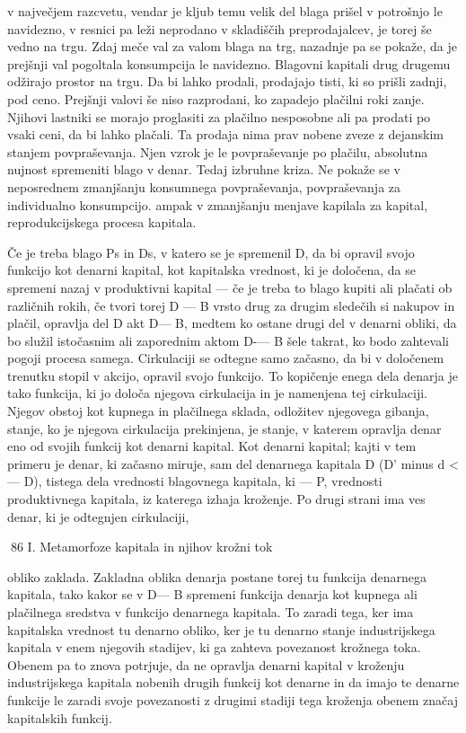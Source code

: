 \documentclass[kapital_02.tex]{subfiles}
\begin{document}
 v največjem razcvetu, vendar je kljub temu velik del blaga prišel v potrošnjo le navidezno, v resnici pa leži neprodano v skladiščih preprodajalcev, je torej še vedno na trgu. Zdaj meče val za valom blaga na trg, nazadnje pa se pokaže, da je prejšnji val pogoltala konsumpcija le navidezno. Blagovni kapitali drug drugemu odžirajo prostor na trgu. Da bi lahko prodali, prodajajo tisti, ki so prišli zadnji, pod ceno. Prejšnji valovi še niso razprodani, ko zapadejo plačilni roki zanje. Njihovi lastniki se morajo proglasiti za plačilno nesposobne ali pa prodati po vsaki ceni, da bi lahko plačali. Ta prodaja nima prav nobene zveze z dejanskim stanjem povpraševanja. Njen vzrok je le povpraševanje po plačilu, absolutna nujnost spremeniti blago v denar. Tedaj izbruhne kriza. Ne pokaže se v neposrednem zmanjšanju konsumnega povpraševanja, povpraševanja za individualno konsumpcijo. ampak v zmanjšanju menjave kapilala za kapital, reprodukcijskega procesa kapitala.

Če je treba blago Ps in Ds, v katero se je spremenil D, da bi opravil svojo funkcijo kot denarni kapital, kot kapitalska vrednost, ki je določena, da se spremeni nazaj v produktivni kapital — če je treba to blago kupiti ali plačati ob različnih rokih, če tvori torej D — B vrsto drug za drugim sledečih si nakupov in plačil, opravlja del D akt D— B, medtem ko ostane drugi del v denarni obliki, da bo služil istočasnim ali zaporednim aktom D-— B šele takrat, ko bodo zahtevali pogoji procesa samega. Cirkulaciji se odtegne samo začasno, da bi v določenem trenutku stopil v akcijo, opravil svojo funkcijo. To kopičenje enega dela denarja je tako funkcija, ki jo določa njegova cirkulacija in je namenjena tej cirkulaciji. Njegov obstoj kot kupnega in plačilnega sklada, odložitev njegovega gibanja, stanje, ko je njegova cirkulacija prekinjena, je stanje, v katerem opravlja denar eno od svojih funkcij kot denarni kapital. Kot denarni kapital; kajti v tem primeru je denar, ki začasno miruje, sam del denarnega kapitala D (D' minus d <— D), tistega dela vrednosti blagovnega kapitala, ki — P, vrednosti produktivnega kapitala, iz katerega izhaja kroženje. Po drugi strani ima ves denar, ki je odtegnjen cirkulaciji,



86 I. Metamorfoze kapitala in njihov krožni tok



 obliko zaklada. Zakladna oblika denarja postane torej tu funkcija denarnega kapitala, tako kakor se v D— B spremeni funkcija denarja kot kupnega ali plačilnega sredstva v funkcijo denarnega kapitala. To zaradi tega, ker ima kapitalska vrednost tu denarno obliko, ker je tu denarno stanje industrijskega kapitala v enem njegovih stadijev, ki ga zahteva povezanost krožnega toka. Obenem pa to znova potrjuje, da ne opravlja denarni kapital v kroženju industrijskega kapitala nobenih drugih funkcij kot denarne in da imajo te denarne funkcije le zaradi svoje povezanosti z drugimi stadiji tega kroženja obenem značaj kapitalskih funkcij.
\end{document}
